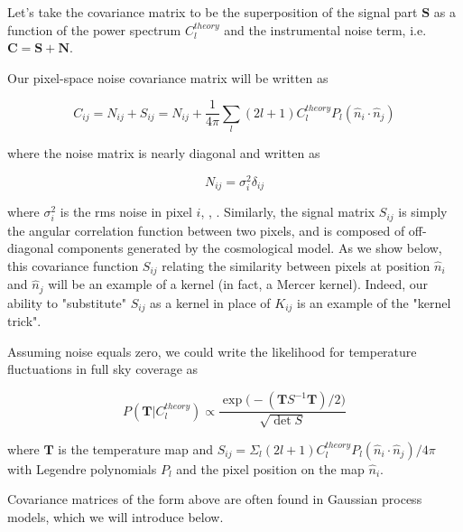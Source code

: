 \documentclass[12pt]{article}
\begin{document}
Let's take the covariance matrix to be the superposition of the signal part $\textbf{S}$ as a function of the power spectrum $C^{theory}_l$ and the instrumental noise term, i.e. $\textbf{C}=\textbf{S}+\textbf{N}$. 

Our pixel-space noise covariance matrix will be written as 

\begin{equation}
C_{ij}=N_{ij}+S_{ij}=N_{ij}+\frac{1}{4\pi}\sum\limits_{l}(2l+1)C^{theory}_l P_l (\hat{n}_i\cdot\hat{n}_j)
\end{equation}

where the noise matrix is nearly diagonal and written as

\begin{equation}
N_{ij}=\sigma^2_i\delta_{ij}
\end{equation}

where $\sigma_i^2$ is the rms noise in pixel $i$, \cite{SpergelOh}, \cite{Hinshaw}. Similarly, the signal matrix $S_{ij}$ is simply the angular correlation function between two pixels, and is composed of off-diagonal components generated by the cosmological model. As we show below, this covariance function $S_{ij}$ relating the similarity between pixels at position $\hat{n}_i$ and $\hat{n}_j$ will be an example of a kernel (in fact, a Mercer kernel). Indeed, our ability to "substitute" $S_{ij}$ as a kernel in place of $K_{ij}$ is an example of the "kernel trick". 



Assuming noise equals zero, we could write the likelihood for temperature fluctuations in full sky coverage as 

\begin{equation}
P(\textbf{T}\rvert C^{theory}_l)\propto\frac{\exp\big(-(\textbf{T}S^{-1}\textbf{T})/2\big)}{\sqrt{\det S}}
\end{equation}

where $\textbf{T}$ is the temperature map and $S_{ij}=\Sigma_l (2l+1)C^{theory}_lP_l(\hat{n}_i\cdot\hat{n}_j)/4\pi$ with Legendre polynomials $P_l$ and the pixel position on the map $\hat{n}_i$. 

Covariance matrices of the form above are often found in Gaussian process models, which we will introduce below. 


\end{document}
